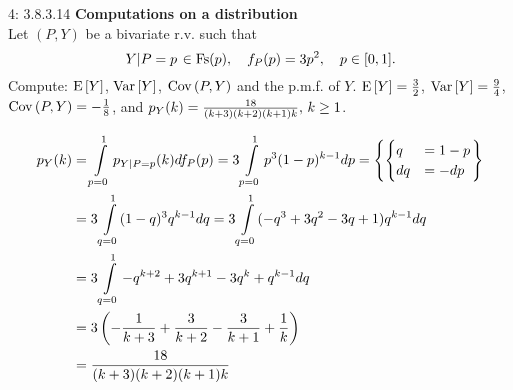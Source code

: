 \documentclass[a4paper,twoside=false,abstract=false,numbers=noenddot,
titlepage=false,headings=small,parskip=half,version=last]{scrartcl}
\begin{document}
\begin{exercise}{4: 3.8.3.14} \textbf{Computations on a distribution} \\
    Let $(P,Y)$ be a bivariate r.v. such that
    \begin{equation}
        \left. Y \middle\vert P=p \right. \in \text{Fs}(p),\quad
        f_P(p)=3p^2,\quad
        p\in [0, 1].
    \end{equation}
    Compute: ${\rm E}\,[Y]$, ${\rm Var}\,[Y]$, ${\rm Cov}\,(P, Y)$ and the p.m.f.
    of $Y$.
    \Answer
    ${{\rm E}\,[Y]=\frac{3}{2}}$,
    ${{\rm Var}\,[Y]=\frac{9}{4}}$,
    ${{\rm Cov}\,(P,Y)=-\frac{1}{8}}$, and
    $p_{Y} (k) = \frac{18}{(k+3)(k+2)(k+1)k},\, k \ge 1$.

\end{exercise}
\begin{solution}

    \begin{align}
        p_{Y} (k) &= \int\limits_{p=0}^1 p_{Y|P=p} (k) df_P(p) =
        3\int\limits_{p=0}^1 p^3 (1-p)^{k-1}dp = \left\{
            \begin{cases}
                q   & = 1-p \\
                dq  & = -dp
            \end{cases}
        \right\} \nonumber \\ & =
        3\int\limits_{q=0}^1 (1-q)^3 q^{k-1} dq =
        3\int\limits_{q=0}^1 (-q^3+3 q^2-3 q+1) q^{k-1} dq \nonumber \\ & =
        3\int\limits_{q=0}^1 -q^{k+2}+3q^{k+1}-3q^k+q^{k-1} dq \nonumber \\ & =
        3\left(-\frac{1}{k+3}+\frac{3}{k+2}-\frac{3}{k+1}+\frac{1}{k}\right) \nonumber \\ & =
        \frac{18}{(k+3)(k+2)(k+1)k}
    \end{align} %

\end{solution}
\pagebreak

\end{document}
